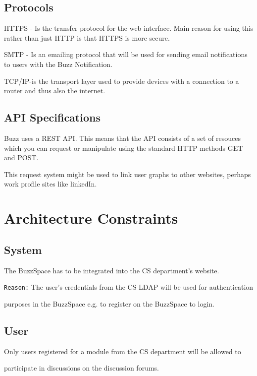 \documentclass[a4paper,12pt]{report}
\begin{document}
\subsection{Protocols}
\begin{description}
\item HTTPS - Is the transfer protocol for the web interface. Main reason for using this rather than just HTTP is that HTTPS is more secure.
\item SMTP - Is an emailing protocol that will be used for sending email notifications to users with the Buzz Notification.	
\item TCP/IP-is the transport layer used to provide devices with a connection to a router 
	and thus also the internet.
\end{description}
\subsection{API Specifications}
\begin{description}
\item Buzz uses a REST API. This means that the API consists of a set of resouces which you can request or manipulate using the standard HTTP methods GET and POST.
\item This request system might be used to link user graphs to other websites, perhaps work profile sites like linkedIn.
\end{description}

\section{Architecture Constraints}

\subsection{System}
	\begin{description}
\item The BuzzSpace has to be integrated into the CS department’s website. 
 \item \texttt{Reason:} The user’s credentials from the CS LDAP will be used for authentication 
\item  purposes in the BuzzSpace e.g. to register on the BuzzSpace to login.
\end{description}

\subsection{User}
	\begin{description}
	\item[$\bullet$] 
Only users registered for a module from the CS department will be allowed to 
\item participate in discussions on the discussion forums.
\end{description}
\end{document}
